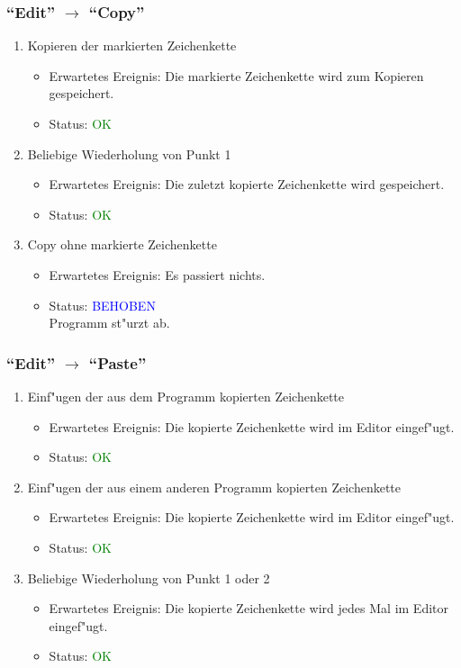 \subsubsection{"`Edit"' $\rightarrow$ "`Copy"'}
\begin{enumerate}
\item Kopieren der markierten Zeichenkette
\begin{itemize}
\item Erwartetes Ereignis: Die markierte Zeichenkette wird zum Kopieren gespeichert. 
\item Status: \textcolor{green}{OK}
\end{itemize}
\item Beliebige Wiederholung von Punkt 1
\begin{itemize}
\item Erwartetes Ereignis: Die zuletzt kopierte Zeichenkette wird gespeichert. 
\item Status: \textcolor{green}{OK}
\end{itemize}
\item Copy ohne markierte Zeichenkette
\begin{itemize}
\item Erwartetes Ereignis: Es passiert nichts. 
\item Status: \textcolor{blue}{BEHOBEN} \\
Programm st"urzt ab.
\end{itemize}
\end{enumerate}
\subsubsection{"`Edit"' $\rightarrow$ "`Paste"'}
\begin{enumerate}
\item Einf"ugen der aus dem Programm kopierten Zeichenkette
\begin{itemize}
\item Erwartetes Ereignis: Die kopierte Zeichenkette wird im Editor eingef"ugt. 
\item Status: \textcolor{green}{OK}
\end{itemize}
\item Einf"ugen der aus einem anderen Programm kopierten Zeichenkette
\begin{itemize}
\item Erwartetes Ereignis: Die kopierte Zeichenkette wird im Editor eingef"ugt. 
\item Status: \textcolor{green}{OK}
\end{itemize}
\item Beliebige Wiederholung von Punkt 1 oder 2
\begin{itemize}
\item Erwartetes Ereignis: Die kopierte Zeichenkette wird jedes Mal im Editor eingef"ugt. 
\item Status: \textcolor{green}{OK}
\end{itemize}
\end{enumerate}
